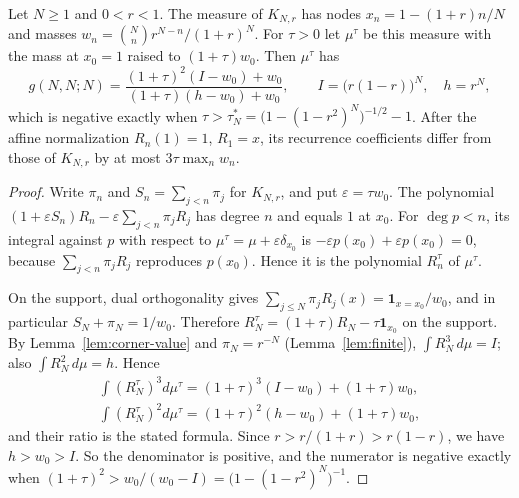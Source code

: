 \begin{proposition}\label{prop:raise}
Let $N\geq1$ and $0<r<1$. The measure of $K_{N,r}$ has nodes $x_n=1-(1+r)n/N$ and masses $w_n=\binom Nnr^{N-n}/(1+r)^N$. For $\tau>0$ let $\mu^\tau$ be this measure with the mass at $x_0=1$ raised to $(1+\tau)w_0$. Then $\mu^\tau$ has
\[
g(N,N;N)=\frac{(1+\tau)^2(I-w_0)+w_0}{(1+\tau)(h-w_0)+w_0},\qquad I=\bigl(r(1-r)\bigr)^N,\quad h=r^N,
\]
which is negative exactly when $\tau>\tau_N^*=\bigl(1-(1-r^2)^N\bigr)^{-1/2}-1$. After the affine normalization $R_n(1)=1$, $R_1=x$, its recurrence coefficients differ from those of $K_{N,r}$ by at most $3\tau\max_nw_n$.
\end{proposition}
\begin{proof}
Write $\pi_n$ and $S_n=\sum_{j<n}\pi_j$ for $K_{N,r}$, and put $\varepsilon=\tau w_0$. The polynomial $(1+\varepsilon S_n)R_n-\varepsilon\sum_{j<n}\pi_jR_j$ has degree $n$ and equals $1$ at $x_0$. For $\deg p<n$, its integral against $p$ with respect to $\mu^\tau=\mu+\varepsilon\delta_{x_0}$ is $-\varepsilon p(x_0)+\varepsilon p(x_0)=0$, because $\sum_{j<n}\pi_jR_j$ reproduces $p(x_0)$. Hence it is the polynomial $R_n^\tau$ of $\mu^\tau$.

On the support, dual orthogonality gives $\sum_{j\leq N}\pi_jR_j(x)=\boldsymbol1_{x=x_0}/w_0$, and in particular $S_N+\pi_N=1/w_0$. Therefore $R_N^\tau=(1+\tau)R_N-\tau\boldsymbol1_{x_0}$ on the support. By Lemma~\ref{lem:corner-value} and $\pi_N=r^{-N}$ (Lemma~\ref{lem:finite}), $\int R_N^3\,d\mu=I$; also $\int R_N^2\,d\mu=h$. Hence
\begin{gather*}
\int(R_N^\tau)^3d\mu^\tau=(1+\tau)^3(I-w_0)+(1+\tau)w_0,\\
\int(R_N^\tau)^2d\mu^\tau=(1+\tau)^2(h-w_0)+(1+\tau)w_0,
\end{gather*}
and their ratio is the stated formula. Since $r>r/(1+r)>r(1-r)$, we have $h>w_0>I$. So the denominator is positive, and the numerator is negative exactly when $(1+\tau)^2>w_0/(w_0-I)=\bigl(1-(1-r^2)^N\bigr)^{-1}$.


\end{proof}

